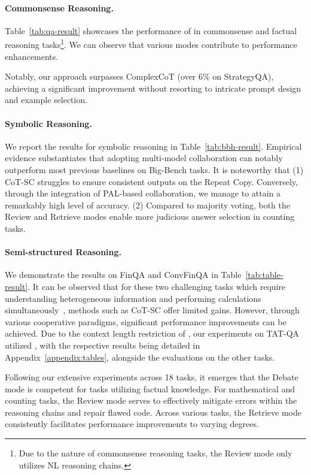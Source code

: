 \paragraph{Commonsense Reasoning.} 
Table~\ref{tab:qa-result} showcases the performance of \ours in commonsense and factual reasoning tasks\footnote{Due to the nature of commonsense reasoning tasks, 
the Review mode only utilizes NL reasoning chains.}.
We can observe that various modes contribute to performance enhancements.



Notably, our approach surpasses ComplexCoT (over 6\% on StrategyQA),
achieving a significant improvement without resorting to intricate prompt design and example selection.

\paragraph{Symbolic Reasoning.}
We report the results for symbolic reasoning in Table~\ref{tab:bbh-result}.
Empirical evidence substantiates that adopting multi-model collaboration can notably outperform most previous baselines on Big-Bench tasks. 
It is noteworthy that 
(1) CoT-SC struggles to ensure consistent outputs on the Repeat Copy.
Conversely, 
through the integration of PAL-based collaboration, 
we manage to attain a remarkably high level of accuracy.
(2) Compared to majority voting, 
both the Review and Retrieve modes enable more judicious answer selection in counting tasks.



\paragraph{Semi-structured Reasoning.}
We demonstrate the results on FinQA and ConvFinQA in Table~\ref{tab:table-result}.
It can be observed that for these two challenging tasks which require understanding heterogeneous information and performing calculations simultaneously~\citep{lu2023dynamic}, 
methods such as CoT-SC offer limited gains. 
However, 
through various cooperative paradigms, 
significant performance improvements can be achieved.
Due to the context length restriction of \turbon, 
our experiments on TAT-QA utilized \turbol,
with the respective results being detailed in Appendix~\ref{appendix:tables}, 
alongside the evaluations on the other tasks.

Following our extensive experiments across 18 tasks,
it emerges that the Debate mode is competent for tasks utilizing factual knowledge.
For mathematical and counting tasks,
the Review mode serves to effectively mitigate errors within the reasoning chains and repair flawed code. 
Across various tasks, 
the Retrieve mode consistently facilitates performance improvements to varying degrees.

